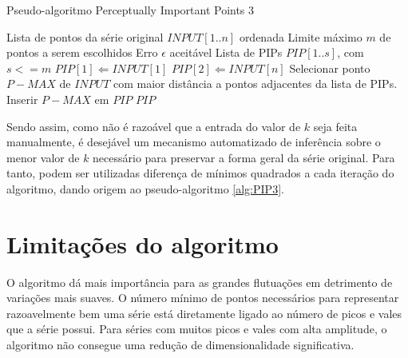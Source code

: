 \begin{algorithm}[h!]
  \caption{Pseudo-algoritmo Perceptually Important Points 3}
  \label{alg:PIP3}
  \begin{algorithmic}[1]
  \REQUIRE Lista de pontos da série original $INPUT[1..n]$ ordenada
  \REQUIRE Limite máximo $m$ de pontos a serem escolhidos
  \REQUIRE Erro $\epsilon$ aceitável
  \ENSURE Lista de PIPs $PIP[1..s]$, com $ s <= m$
  \STATE $PIP[1] \Leftarrow INPUT[1]$
  \STATE $PIP[2] \Leftarrow INPUT[n]$
  \REPEAT
    \STATE Selecionar ponto $P-MAX$ de $INPUT$ com maior distância a pontos adjacentes da lista de PIPs. 
    \STATE Inserir $P-MAX$ em $PIP$
  \RETURN $PIP$
  \end{algorithmic}
\end{algorithm}

Sendo assim, como não é razoável que a entrada do valor de $k$ seja feita manualmente, é desejável um mecanismo automatizado de inferência sobre o menor valor de $k$ necessário para preservar a forma geral da série original. Para tanto, podem ser utilizadas diferença de mínimos quadrados a cada iteração do algoritmo, dando origem ao pseudo-algoritmo \ref{alg:PIP3}.

\section{Limitações do algoritmo}
\label{sec:limitacoes}
O algoritmo dá mais importância para as grandes flutuações em detrimento de variações mais suaves. O número mínimo de pontos necessários para representar razoavelmente bem uma série está diretamente ligado ao número de picos e vales que a série possui. Para séries com muitos picos e vales com alta amplitude, o algoritmo não consegue uma redução de dimensionalidade significativa.

